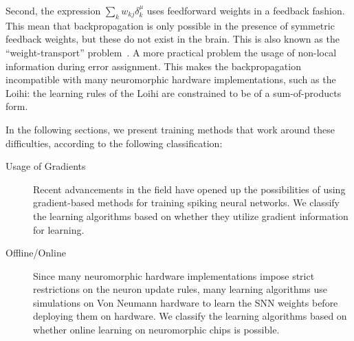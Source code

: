 \documentclass[fyp]{socreport}
\begin{document}
Second, the expression \(\sum_{k} w_{k j} \delta_{k}^{\mu}\) uses feedforward
weights in a feedback fashion. This mean that backpropagation is only possible
in the presence of symmetric feedback weights, but these do not exist in the
brain. This is also known as the ``weight-transport''
problem~\cite{grossberg1987competitive}. A more practical problem the usage of
non-local information during error assignment. This makes the backpropagation
incompatible with many neuromorphic hardware implementations, such as the Loihi:
the learning rules of the Loihi are constrained to be of a sum-of-products form.

In the following sections, we present training methods that work around these
difficulties, according to the following classification:

\begin{description}
  \item[Usage of Gradients] Recent advancements in the field have opened up the possibilities of using gradient-based methods for training spiking neural networks. We classify the learning algorithms based on whether they utilize gradient information for learning.
  \item[Offline/Online] Since many neuromorphic hardware implementations impose strict restrictions on the neuron update rules, many learning algorithms use simulations on Von Neumann hardware to learn the SNN weights before deploying them on hardware. We classify the learning algorithms based on whether online learning on neuromorphic chips is possible.
\end{description}
\end{document}
